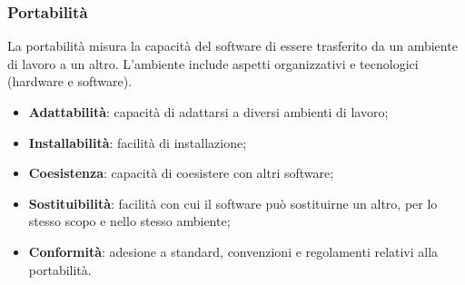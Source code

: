 \subsubsection{Portabilità}
La portabilità misura la capacità del software di essere trasferito da un ambiente di lavoro a un altro.
L'ambiente include aspetti organizzativi e tecnologici (hardware e software).
\begin{itemize}
    \item \textbf{Adattabilità}: capacità di adattarsi a diversi ambienti di lavoro;
    \item \textbf{Installabilità}: facilità di installazione;
    \item \textbf{Coesistenza}: capacità di coesistere con altri software;
    \item \textbf{Sostituibilità}: facilità con cui il software può sostituirne un altro, per lo 
        stesso scopo e nello stesso ambiente;
    \item \textbf{Conformità}: adesione a standard, convenzioni e regolamenti relativi alla portabilità.
\end{itemize}